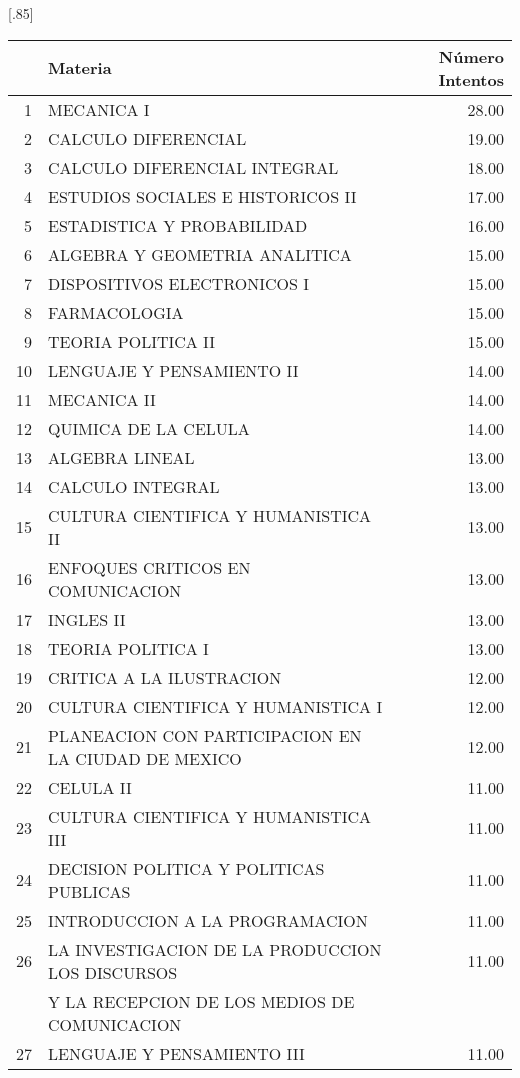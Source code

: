 \documentclass[12pt]{article}
\begin{document}
\begin{table}[ht]
\centering
\scalebox{0.75}[.85]{
\begin{tabular}{rlr}
  \hline
 & Materia & N\'umero Intentos \\ 
  \hline
1 & MECANICA I & 28.00 \\ 
  2 & CALCULO DIFERENCIAL & 19.00 \\ 
3 & CALCULO DIFERENCIAL INTEGRAL & 18.00 \\ 
  4 & ESTUDIOS SOCIALES E HISTORICOS II & 17.00 \\ 
 5 & ESTADISTICA Y PROBABILIDAD & 16.00 \\ 
  6 & ALGEBRA Y GEOMETRIA ANALITICA & 15.00 \\ 
  7 & DISPOSITIVOS ELECTRONICOS I & 15.00 \\ 
  8 & FARMACOLOGIA & 15.00 \\ 
  9 & TEORIA POLITICA II & 15.00 \\ 
  10 & LENGUAJE Y PENSAMIENTO II & 14.00 \\ 
  11 & MECANICA II & 14.00 \\ 
  12 & QUIMICA DE LA CELULA & 14.00 \\ 
  13 & ALGEBRA LINEAL & 13.00 \\ 
  14 & CALCULO INTEGRAL & 13.00 \\ 
  15 & CULTURA CIENTIFICA Y HUMANISTICA II & 13.00 \\ 
  16 & ENFOQUES CRITICOS EN COMUNICACION & 13.00 \\ 
  17 & INGLES II & 13.00 \\ 
  18 & TEORIA POLITICA I & 13.00 \\ 
  19 & CRITICA A LA ILUSTRACION & 12.00 \\ 
  20 & CULTURA CIENTIFICA Y HUMANISTICA I & 12.00 \\ 
  21 & PLANEACION CON PARTICIPACION EN LA CIUDAD DE MEXICO & 12.00 \\ 
  22 & CELULA II & 11.00 \\ 
  23 & CULTURA CIENTIFICA Y HUMANISTICA III & 11.00 \\ 
  24 & DECISION POLITICA Y POLITICAS PUBLICAS & 11.00 \\ 
  25 & INTRODUCCION A LA PROGRAMACION & 11.00 \\ 
  26 & LA INVESTIGACION DE LA PRODUCCION LOS DISCURSOS & 11.00 \\ 
 &  Y LA RECEPCION DE LOS MEDIOS DE COMUNICACION & \\ 
  27 & LENGUAJE Y PENSAMIENTO III & 11.00 \\ 

\end{tabular}}
\end{table}
\end{document}
